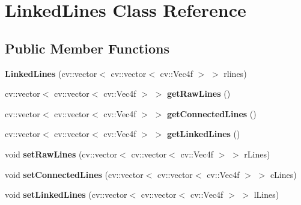 \hypertarget{classLinkedLines}{
\section{LinkedLines Class Reference}
\label{classLinkedLines}
}
\subsection*{Public Member Functions}
\begin{DoxyCompactItemize}
\item 
\hypertarget{classLinkedLines_a98a7b4c38df7439900c7de0302587517}{
{\bfseries LinkedLines} (cv::vector$<$ cv::vector$<$ cv::Vec4f $>$ $>$ rlines)}
\label{classLinkedLines_a98a7b4c38df7439900c7de0302587517}

\item 
\hypertarget{classLinkedLines_a1855357157ea2fa0e3df79efaf08c15f}{
cv::vector$<$ cv::vector$<$ cv::Vec4f $>$ $>$ {\bfseries getRawLines} ()}
\label{classLinkedLines_a1855357157ea2fa0e3df79efaf08c15f}

\item 
\hypertarget{classLinkedLines_a81567fe814c34bb378aaf89e740f1bff}{
cv::vector$<$ cv::vector$<$ cv::Vec4f $>$ $>$ {\bfseries getConnectedLines} ()}
\label{classLinkedLines_a81567fe814c34bb378aaf89e740f1bff}

\item 
\hypertarget{classLinkedLines_a052e4c4aa0182ccfe10283a13d5d4bb6}{
cv::vector$<$ cv::vector$<$ cv::Vec4f $>$ $>$ {\bfseries getLinkedLines} ()}
\label{classLinkedLines_a052e4c4aa0182ccfe10283a13d5d4bb6}

\item 
\hypertarget{classLinkedLines_a1d64ace06246a0c8a936d8bb367a1a2e}{
void {\bfseries setRawLines} (cv::vector$<$ cv::vector$<$ cv::Vec4f $>$ $>$ rLines)}
\label{classLinkedLines_a1d64ace06246a0c8a936d8bb367a1a2e}

\item 
\hypertarget{classLinkedLines_a0e8392e18661b14ff54c9b6ac79ef134}{
void {\bfseries setConnectedLines} (cv::vector$<$ cv::vector$<$ cv::Vec4f $>$ $>$ cLines)}
\label{classLinkedLines_a0e8392e18661b14ff54c9b6ac79ef134}

\item 
\hypertarget{classLinkedLines_af4d725cfb6d041a727fe8f9abadbc300}{
void {\bfseries setLinkedLines} (cv::vector$<$ cv::vector$<$ cv::Vec4f $>$ $>$ lLines)}
\label{classLinkedLines_af4d725cfb6d041a727fe8f9abadbc300}


\end{DoxyCompactItemize}
